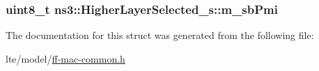 \subsubsection[{\texorpdfstring{m\+\_\+sb\+Pmi}{m_sbPmi}}]{\setlength{\rightskip}{0pt plus 5cm}uint8\+\_\+t ns3\+::\+Higher\+Layer\+Selected\+\_\+s\+::m\+\_\+sb\+Pmi}\hypertarget{structns3_1_1HigherLayerSelected__s_a4aa4dc94c19c124204ff6529071d0e88}{}\label{structns3_1_1HigherLayerSelected__s_a4aa4dc94c19c124204ff6529071d0e88}


The documentation for this struct was generated from the following file\+:\begin{DoxyCompactItemize}
\item 
lte/model/\hyperlink{ff-mac-common_8h}{ff-\/mac-\/common.\+h}\end{DoxyCompactItemize}
